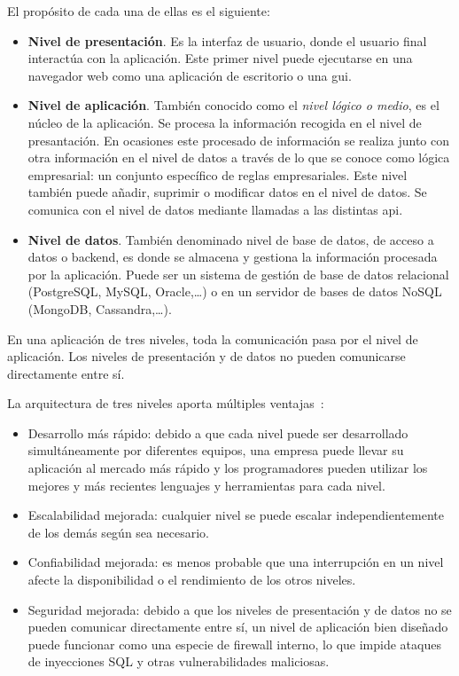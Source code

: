 El propósito de cada una de ellas es el siguiente:
\begin{itemize}
\item \textbf{Nivel de presentación}. Es la interfaz de usuario, donde el usuario final interactúa con la aplicación. Este primer nivel puede ejecutarse en una navegador web como una aplicación de escritorio o una \acrshort{gui}.
\item \textbf{Nivel de aplicación}. También conocido como el \textit{nivel lógico o medio}, es el núcleo de la aplicación. Se procesa la información recogida en el nivel de presantación. En ocasiones este procesado de información se realiza junto con otra información en el nivel de datos a través de lo que se conoce como  lógica empresarial: un conjunto específico de reglas empresariales. Este nivel también puede añadir, suprimir o modificar datos en el nivel de datos. Se comunica con el nivel de datos mediante llamadas a las distintas \acrshort{api}. 
\item \textbf{Nivel de datos}. También denominado nivel de base de datos, de acceso a datos o backend, es donde se almacena y gestiona la información procesada por la aplicación. Puede ser un sistema de gestión de base de datos relacional (PostgreSQL, MySQL, Oracle,\dots) o en un servidor de bases de datos NoSQL (MongoDB, Cassandra,\dots). \newline
\end{itemize}


En una aplicación de tres niveles, toda la comunicación pasa por el nivel de aplicación. Los niveles de presentación y de datos no pueden comunicarse directamente entre sí.

La arquitectura de tres niveles aporta múltiples ventajas~\cite{ibmMVC}:
\begin{itemize}
\item Desarrollo más rápido: debido a que cada nivel puede ser desarrollado simultáneamente por diferentes equipos, una empresa puede llevar su aplicación al mercado más rápido y los programadores pueden utilizar los mejores y más recientes lenguajes y herramientas para cada nivel.
\item Escalabilidad mejorada: cualquier nivel se puede escalar independientemente de los demás según sea necesario.
\item Confiabilidad mejorada: es menos probable que una interrupción en un nivel afecte la disponibilidad o el rendimiento de los otros niveles.
\item Seguridad mejorada: debido a que los niveles de presentación y de datos no se pueden comunicar directamente entre sí, un nivel de aplicación bien diseñado puede funcionar como una especie de firewall interno, lo que impide ataques de inyecciones SQL y otras vulnerabilidades maliciosas.
\end{itemize}


